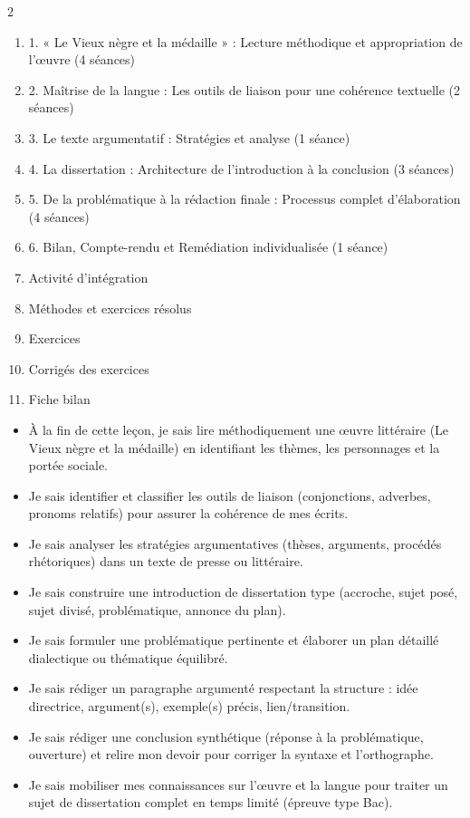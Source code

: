 \documentclass[11pt]{article}
\begin{document}
\begin{sommaire}
\begin{multicols}{2}
\begin{enumerate}
\item 1. « Le Vieux nègre et la médaille » : Lecture méthodique et appropriation de l'œuvre (4 séances)
\item 2. Maîtrise de la langue : Les outils de liaison pour une cohérence textuelle (2 séances)
\item 3. Le texte argumentatif : Stratégies et analyse (1 séance)
\item 4. La dissertation : Architecture de l'introduction à la conclusion (3 séances)
\item 5. De la problématique à la rédaction finale : Processus complet d'élaboration (4 séances)
\item 6. Bilan, Compte-rendu et Remédiation individualisée (1 séance)
\item Activité d'intégration
\item Méthodes et exercices résolus
\item Exercices
\item Corrigés des exercices
\item Fiche bilan
\end{enumerate}
\end{multicols}
\end{sommaire}

\begin{objectifs}
\begin{itemize}
\item À la fin de cette leçon, je sais lire méthodiquement une œuvre littéraire (Le Vieux nègre et la médaille) en identifiant les thèmes, les personnages et la portée sociale.
\item Je sais identifier et classifier les outils de liaison (conjonctions, adverbes, pronoms relatifs) pour assurer la cohérence de mes écrits.
\item Je sais analyser les stratégies argumentatives (thèses, arguments, procédés rhétoriques) dans un texte de presse ou littéraire.
\item Je sais construire une introduction de dissertation type (accroche, sujet posé, sujet divisé, problématique, annonce du plan).
\item Je sais formuler une problématique pertinente et élaborer un plan détaillé dialectique ou thématique équilibré.
\item Je sais rédiger un paragraphe argumenté respectant la structure : idée directrice, argument(s), exemple(s) précis, lien/transition.
\item Je sais rédiger une conclusion synthétique (réponse à la problématique, ouverture) et relire mon devoir pour corriger la syntaxe et l'orthographe.
\item Je sais mobiliser mes connaissances sur l'œuvre et la langue pour traiter un sujet de dissertation complet en temps limité (épreuve type Bac).
\end{itemize}
\end{objectifs}
\end{document}
